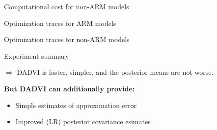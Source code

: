 \documentclass[8pt]{beamer}\usepackage[]{graphicx}\usepackage[]{color}
\begin{document}
\begin{frame}{Computational cost for non-ARM models}
    \RuntimeNonARM{}
\end{frame}


\begin{frame}{Optimization traces for ARM models}
    \TracesARM{}
\end{frame}


\begin{frame}{Optimization traces for non-ARM models}
    \TracesNonARM{}
\end{frame}



\begin{frame}{Experiment summary}

$\Rightarrow$ DADVI is faster, simpler, and the posterior means are not worse.

\vspace{3em}
\textbf{But DADVI can additionally provide:}
%
\begin{itemize}
\item Simple estimates of approximation error
\item Improved (LR) posterior covariance esimates
\end{itemize}
%

\end{frame}

\end{document}
